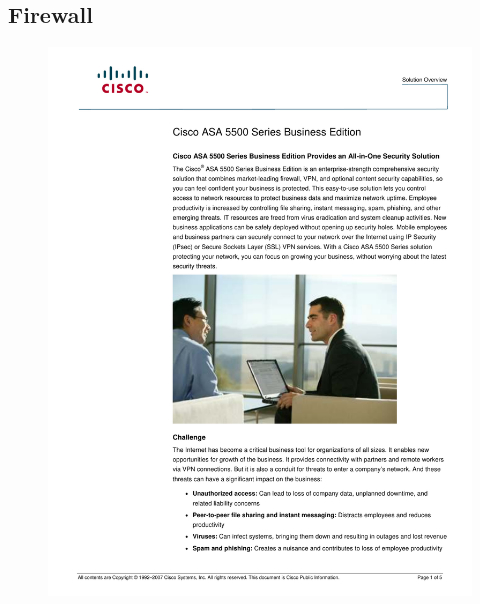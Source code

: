 \documentclass[a4paper, 12pt]{article}
\begin{document}
\subsection{Firewall}
\begin{figure}[H]
\centering
    \includegraphics[scale=0.80]{spec/firewall.pdf}
    \label{fig:PropProf}
\end{figure}
\end{document}
